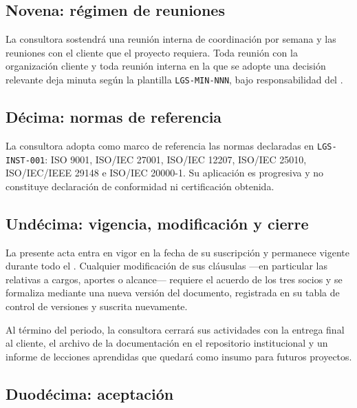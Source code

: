 \subsection{Novena: régimen de reuniones}

La consultora sostendrá una reunión interna de coordinación por semana y las
reuniones con el cliente que el proyecto requiera. Toda reunión con la
organización cliente y toda reunión interna en la que se adopte una decisión
relevante deja minuta según la plantilla \texttt{LGS-MIN-NNN}, bajo
responsabilidad del \lgDirectorRol.

\subsection{Décima: normas de referencia}

La consultora adopta como marco de referencia las normas declaradas en
\texttt{LGS-INST-001}: ISO 9001, ISO/IEC 27001, ISO/IEC 12207, ISO/IEC 25010,
ISO/IEC/IEEE 29148 e ISO/IEC 20000-1. Su aplicación es progresiva y no constituye
declaración de conformidad ni certificación obtenida.

\subsection{Undécima: vigencia, modificación y cierre}

La presente acta entra en vigor en la fecha de su suscripción y permanece vigente
durante todo el \lgSemestre. Cualquier modificación de sus cláusulas —en
particular las relativas a cargos, aportes o alcance— requiere el acuerdo de los
tres socios y se formaliza mediante una nueva versión del documento, registrada
en su tabla de control de versiones y suscrita nuevamente.

Al término del periodo, la consultora cerrará sus actividades con la entrega
final al cliente, el archivo de la documentación en el repositorio institucional
y un informe de lecciones aprendidas que quedará como insumo para futuros
proyectos.

\subsection{Duodécima: aceptación}

